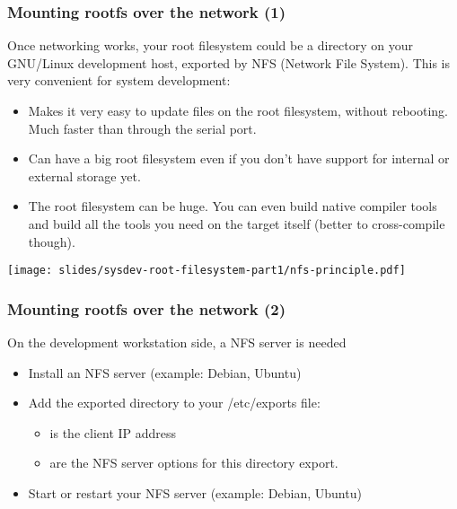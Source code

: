 \begin{frame}
  \frametitle{Mounting rootfs over the network (1)}

  Once networking works, your root filesystem could be a directory on
  your GNU/Linux development host, exported by NFS (Network File
  System). This is very convenient for system development:

  \begin{itemize}
  \item Makes it very easy to update files on the root filesystem,
    without rebooting. Much faster than through the serial port.
  \item Can have a big root filesystem even if you don't have support
    for internal or external storage yet.
  \item The root filesystem can be huge. You can even build native
    compiler tools and build all the tools you need on the target
    itself (better to cross-compile though).
  \end{itemize}

  \begin{center}
    \texttt{[image: slides/sysdev-root-filesystem-part1/nfs-principle.pdf]}
  \end{center}
\end{frame}

\begin{frame}
  \frametitle{Mounting rootfs over the network (2)}

  On the development workstation side, a NFS server is needed

  \begin{itemize}
  \item Install an NFS server (example: Debian, Ubuntu)\\
  \item Add the exported directory to your /etc/exports file:\\
    \begin{itemize}
    \item {} is the client IP address
    \item {} are the NFS server
      options for this directory export.
    \end{itemize}
  \item Start or restart your NFS server (example: Debian, Ubuntu)\\
  \end{itemize}
\end{frame}

